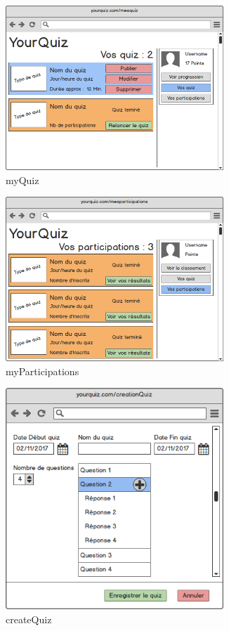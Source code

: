 \documentclass[a4paper, 12pt]{article}
\begin{document}
\begin{figure}
	\begin{center}
		\includegraphics[width=0.73\textwidth]{mockups/png/myQuiz.png}
        \caption{myQuiz}
	\end{center}
\end{figure}
\begin{figure}
	\begin{center}
		\includegraphics[width=0.73\textwidth]{mockups/png/myParticipations.png}
        \caption{myParticipations}
	\end{center}
\end{figure}
\begin{figure}
	\begin{center}
		\includegraphics[width=0.73\textwidth]{mockups/png/createQuiz.png}
        \caption{createQuiz}
	\end{center}
\end{figure}
\end{document}
